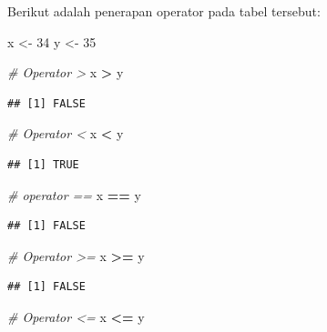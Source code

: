 \documentclass[]{book}
\newenvironment{Shaded}{\begin{snugshade}}{\end{snugshade}}
\newcommand{\CommentTok}[1]{\textcolor[rgb]{0.56,0.35,0.01}{\textit{#1}}}
\newcommand{\DecValTok}[1]{\textcolor[rgb]{0.00,0.00,0.81}{#1}}
\newcommand{\NormalTok}[1]{#1}
\newcommand{\OperatorTok}[1]{\textcolor[rgb]{0.81,0.36,0.00}{\textbf{#1}}}
\newcommand{\StringTok}[1]{\textcolor[rgb]{0.31,0.60,0.02}{#1}}
\theoremstyle{definition}
\theoremstyle{definition}
\theoremstyle{definition}
\theoremstyle{remark}
\begin{document}
Berikut adalah penerapan operator pada tabel tersebut:

\begin{Shaded}
\begin{Highlighting}[]
\NormalTok{x <-}\StringTok{ }\DecValTok{34}
\NormalTok{y <-}\StringTok{ }\DecValTok{35}

\CommentTok{# Operator >}
\NormalTok{x }\OperatorTok{>}\StringTok{ }\NormalTok{y}
\end{Highlighting}
\end{Shaded}

\begin{verbatim}
## [1] FALSE
\end{verbatim}

\begin{Shaded}
\begin{Highlighting}[]
\CommentTok{# Operator <}
\NormalTok{x }\OperatorTok{<}\StringTok{ }\NormalTok{y}
\end{Highlighting}
\end{Shaded}

\begin{verbatim}
## [1] TRUE
\end{verbatim}

\begin{Shaded}
\begin{Highlighting}[]
\CommentTok{# operator ==}
\NormalTok{x }\OperatorTok{==}\StringTok{ }\NormalTok{y}
\end{Highlighting}
\end{Shaded}

\begin{verbatim}
## [1] FALSE
\end{verbatim}

\begin{Shaded}
\begin{Highlighting}[]
\CommentTok{# Operator >=}
\NormalTok{x }\OperatorTok{>=}\StringTok{ }\NormalTok{y}
\end{Highlighting}
\end{Shaded}

\begin{verbatim}
## [1] FALSE
\end{verbatim}

\begin{Shaded}
\begin{Highlighting}[]
\CommentTok{# Operator <=}
\NormalTok{x }\OperatorTok{<=}\StringTok{ }\NormalTok{y}
\end{Highlighting}
\end{Shaded}
\end{document}
